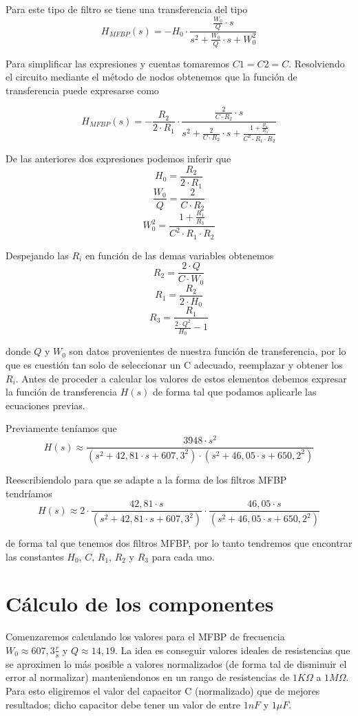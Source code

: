 \documentclass[11pt,a4paper]{report}
\begin{document}
\afterpage{\clearpage}
Para este tipo de filtro se tiene una transferencia del tipo
\[H_{MFBP}(s) = -H_{0} \cdot \frac{\frac{W_{0}}{Q} \cdot s}{s^2 + \frac{W_{0}}{Q} \cdot s + W_{0}^2}\]

Para simplificar las expresiones y cuentas tomaremos $C1 = C2 = C$. Resolviendo el circuito mediante el método de nodos obtenemos que la función de transferencia puede expresarse como

\bigskip
\[H_{MFBP}(s) = -\frac{R_{2}}{2 \cdot R_{1}} \cdot \frac{\frac{2}{C \cdot R_{2}} \cdot s}{s^2 + \frac{2}{C \cdot R_{2}} \cdot s + \frac{1+\frac{R_{1}}{R_{3}}}{C^2 \cdot R_{1} \cdot R_{2}}}\]

De las anteriores dos expresiones podemos inferir que
\[H_{0} = \frac{R_{2}}{2 \cdot R_{1}}\]
\[\frac{W_{0}}{Q} = \frac{2}{C \cdot R_{2}}\]
\[W_{0}^2 = \frac{1+\frac{R_{1}}{R_{3}}}{C^2 \cdot R_{1} \cdot R_{2}}\]

Despejando las $R_{i}$ en función de las demas variables obtenemos
\[R_{2} = \frac{2 \cdot Q}{C \cdot W_{0}}\]
\[R_{1} = \frac{R_{2}}{2 \cdot H_{0}}\]
\[R_{3} = \frac{R_{1}}{\frac{2 \cdot Q^2}{H_{0}} - 1}\]

donde $Q$ y $W_{0}$ son datos provenientes de nuestra función de transferencia, por lo que es cuestión tan solo de seleccionar un C adecuado, reemplazar y obtener los $R_{i}$. Antes de proceder a calcular los valores de estos elementos debemos expresar 
la función de transferencia $H(s)$ de forma tal que podamos aplicarle las ecuaciones previas. 

\bigskip
Previamente teníamos que
\[H(s) \approx \frac{3948 \cdot s^2}{(s^2+42,81 \cdot s + 607,3^2)
\cdot (s^2+46,05 \cdot s + 650,2^2)}\]

Reescribiendolo para que se adapte a la forma de los filtros MFBP\\ tendríamos
\[H(s) \approx 2 \cdot \frac{42,81 \cdot s}{(s^2+42,81 \cdot s + 607,3^2)}
\cdot \frac{46,05 \cdot s}{(s^2+46,05 \cdot s + 650,2^2)}\]

de forma tal que tenemos dos filtros MFBP, por lo tanto tendremos que encontrar las constantes $H_{0}$, $C$, $R_{1}$, $R_{2}$ y $R_{3}$ para cada uno. 

\section*{Cálculo de los componentes}

Comenzaremos calculando los valores para el MFBP de frecuencia \\$W_{0} \approx 607,3 \frac{r}{s}$ y $Q \approx 14,19$. La idea es conseguir valores ideales de resistencias que se aproximen lo más posible a valores normalizados (de forma tal de disminuir el error al normalizar) manteniendonos en un rango de resistencias de $1K\Omega$ a $1M\Omega$.
Para esto eligiremos el valor del capacitor C (normalizado) que de mejores resultados; dicho capacitor debe tener un valor de entre $1nF$ y $1 \mu F$.
\end{document}

